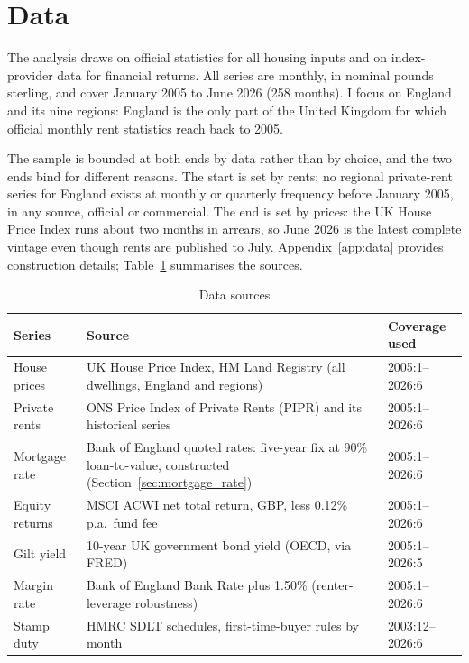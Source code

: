 
\section{Data}
\label{sec:data}

The analysis draws on official statistics for all housing inputs and on index-provider data for financial returns. All series are monthly, in nominal pounds sterling, and cover January 2005 to June 2026 (258 months). I focus on England and its nine regions: England is the only part of the United Kingdom for which official monthly rent statistics reach back to 2005.

The sample is bounded at both ends by data rather than by choice, and the two ends bind for different reasons. The start is set by rents: no regional private-rent series for England exists at monthly or quarterly frequency before January 2005, in any source, official or commercial. The end is set by prices: the UK House Price Index runs about two months in arrears, so June 2026 is the latest complete vintage even though rents are published to July. Appendix~\ref{app:data} provides construction details; Table~\ref{tab:sources} summarises the sources.

\begin{table}[H]
  \centering
  \caption{Data sources}
  \label{tab:sources}
  \begin{threeparttable}
  \begin{tabularx}{\textwidth}{@{}lXl@{}}
    \toprule
    \textbf{Series} & \textbf{Source} & \textbf{Coverage used} \\
    \midrule
    House prices & UK House Price Index, HM Land Registry (all dwellings, England and regions) & 2005:1--2026:6 \\
    Private rents & ONS Price Index of Private Rents (PIPR) and its historical series & 2005:1--2026:6 \\
    Mortgage rate & Bank of England quoted rates: five-year fix at 90\% loan-to-value, constructed (Section~\ref{sec:mortgage_rate}) & 2005:1--2026:6 \\
    Equity returns & MSCI ACWI net total return, GBP, less 0.12\% p.a.\ fund fee & 2005:1--2026:6 \\
    Gilt yield & 10-year UK government bond yield (OECD, via FRED) & 2005:1--2026:5 \\
    Margin rate & Bank of England Bank Rate plus 1.50\% (renter-leverage robustness) & 2005:1--2026:6 \\
    Stamp duty & HMRC SDLT schedules, first-time-buyer rules by month & 2003:12--2026:6 \\
    \bottomrule
  \end{tabularx}
  \end{threeparttable}
\end{table}

